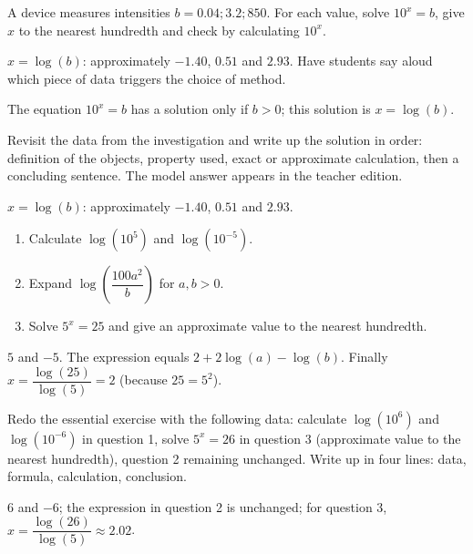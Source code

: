 \begin{activity}
A device measures intensities $b=\num{0,04};\num{3,2};850$. For each value, solve $10^x=b$, give $x$ to the nearest hundredth and check by calculating $10^x$.

\end{activity}
\begin{solution}$x=\log(b)$: approximately $-\num{1,40}$, $\num{0,51}$ and $\num{2,93}$. Have students say aloud which piece of data triggers the choice of method.\end{solution}

\begin{summary}The equation $10^x=b$ has a solution only if $b>0$; this solution is $x=\log(b)$.\end{summary}

\begin{example}
Revisit the data from the investigation and write up the solution in order: definition of the objects, property used, exact or approximate calculation, then a concluding sentence. The model answer appears in the teacher edition.
\end{example}
\begin{solution}$x=\log(b)$: approximately $-\num{1,40}$, $\num{0,51}$ and $\num{2,93}$.\end{solution}

\begin{exercise}[essential]
\begin{enumerate}\item Calculate $\log(10^5)$ and $\log(10^{-5})$.\item Expand $\log\!\left(\dfrac{100a^2}{b}\right)$ for $a,b>0$.\item Solve $5^x=25$ and give an approximate value to the nearest hundredth.\end{enumerate}
\end{exercise}
\begin{solution}$5$ and $-5$. The expression equals $2+2\log(a)-\log(b)$. Finally $x=\dfrac{\log(25)}{\log(5)}=2$ (because $25=5^2$).\end{solution}


\begin{homework}Redo the essential exercise with the following data: calculate $\log(10^{6})$ and $\log(10^{-6})$ in question 1, solve $5^x=26$ in question 3 (approximate value to the nearest hundredth), question 2 remaining unchanged. Write up in four lines: data, formula, calculation, conclusion.\end{homework}
\begin{solution}$6$ and $-6$; the expression in question 2 is unchanged; for question 3, $x=\dfrac{\log(26)}{\log(5)}\approx\num{2,02}$.\end{solution}

